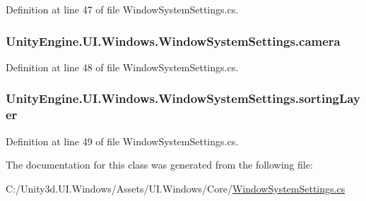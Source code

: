 Definition at line 47 of file Window\+System\+Settings.\+cs.

\hypertarget{class_unity_engine_1_1_u_i_1_1_windows_1_1_window_system_settings_a685b76f7373c278105c1d4550fae23fe}{}
\subsubsection[{camera}]{ Unity\+Engine.\+U\+I.\+Windows.\+Window\+System\+Settings.\+camera}\label{class_unity_engine_1_1_u_i_1_1_windows_1_1_window_system_settings_a685b76f7373c278105c1d4550fae23fe}


Definition at line 48 of file Window\+System\+Settings.\+cs.

\hypertarget{class_unity_engine_1_1_u_i_1_1_windows_1_1_window_system_settings_a5777169e9abf9d32058b1a57cc78fded}{}
\subsubsection[{sorting\+Layer}]{ Unity\+Engine.\+U\+I.\+Windows.\+Window\+System\+Settings.\+sorting\+Layer}\label{class_unity_engine_1_1_u_i_1_1_windows_1_1_window_system_settings_a5777169e9abf9d32058b1a57cc78fded}


Definition at line 49 of file Window\+System\+Settings.\+cs.



The documentation for this class was generated from the following file\+:\begin{DoxyCompactItemize}
\item 
C\+:/\+Unity3d.\+U\+I.\+Windows/\+Assets/\+U\+I.\+Windows/\+Core/\hyperlink{_window_system_settings_8cs}{Window\+System\+Settings.\+cs}\end{DoxyCompactItemize}
